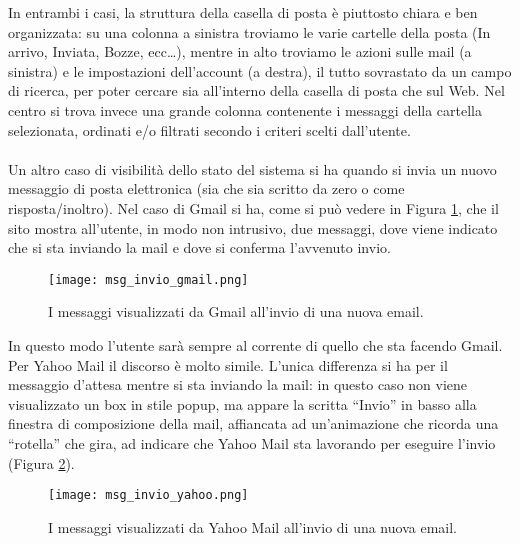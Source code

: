 		In entrambi i casi, la struttura della casella di posta è piuttosto chiara e ben organizzata: su una colonna a sinistra troviamo le varie cartelle della posta (In arrivo, Inviata, Bozze, ecc\dots), mentre in alto troviamo le azioni sulle mail (a sinistra) e le impostazioni dell'account (a destra), il tutto sovrastato da un campo di ricerca, per poter cercare sia all'interno della casella di posta che sul Web. Nel centro si trova invece una grande colonna contenente i messaggi della cartella selezionata, ordinati e/o filtrati secondo i criteri scelti dall'utente.\\
		\\
		Un altro caso di visibilità dello stato del sistema si ha quando si invia un nuovo messaggio di posta elettronica (sia che sia scritto da zero o come risposta/inoltro). Nel caso di Gmail si ha, come si può vedere in Figura \ref{fig:msg_invio_gmail}, che il sito mostra all'utente, in modo non intrusivo, due messaggi, dove viene indicato che si sta inviando la mail e dove si conferma l'avvenuto invio.
		\begin{figure}[h!]
			\begin{center}
				\texttt{[image: msg\_invio\_gmail.png]}
			\end{center}
			\caption[Messaggi d'invio in Gmail]{I messaggi visualizzati da Gmail all'invio di una nuova email.}
			\label{fig:msg_invio_gmail}
		\end{figure}
		
		In questo modo l'utente sarà sempre al corrente di quello che sta facendo Gmail. Per Yahoo Mail il discorso è molto simile. L'unica differenza si ha per il messaggio d'attesa mentre si sta inviando la mail: in questo caso non viene visualizzato un box in stile popup, ma appare la scritta ``Invio'' in basso alla finestra di composizione della mail, affiancata ad un'animazione che ricorda una ``rotella'' che gira, ad indicare che Yahoo Mail sta lavorando per eseguire l'invio (Figura \ref{fig:msg_invio_yahoo}).
		\begin{figure}[h!]
			\begin{center}
				\texttt{[image: msg\_invio\_yahoo.png]}
			\end{center}
			\caption[Messaggi d'invio in Yahoo Mail]{I messaggi visualizzati da Yahoo Mail all'invio di una nuova email.}
			\label{fig:msg_invio_yahoo}
		\end{figure}
		
